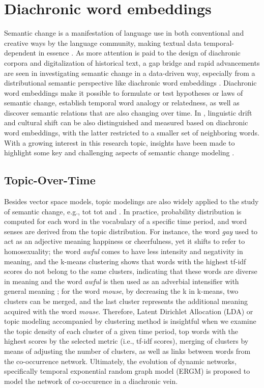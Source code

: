 \section{Diachronic word embeddings}
Semantic change is a manifestation of language use in both conventional and creative ways by the language community, making textual data temporal-dependent in essence \parencite{kutuzov2018survey}. As more attention is paid to the design of diachronic corpora and digitalization of historical text, a gap bridge and rapid advancements are seen in investigating semantic change in a data-driven way, especially from a distributional semantic perspective like diachronic word embeddings \parencite{kutuzov2018survey, tahmasebi2018survey, hamilton2016law, jawahar2019contextualized}. Diachronic word embeddings make it possible to formulate or test hypotheses or laws of semantic change, establish temporal word analogy or relatedness, as well as discover semantic relations that are also changing over time. In \textcite{hamilton2016cultural}, linguistic drift and cultural shift can be also distinguished and measured based on diachronic word embeddings, with the latter restricted to a smaller set of neighboring words. With a growing interest in this research topic, insights have been made to highlight some key and challenging aspects of semantic change modeling \parencite{kutuzov2018survey,tahmasebi2018survey,camacho2018survey}.

\subsection{Topic-Over-Time}
Besides vector space models, topic modelings are also widely applied to the study of semantic change, e.g., \acrlong{tot} \acrshort{tot} \parencite{wijaya2011understanding} and \textcite{hengchen2017phd}. In practice, probability distribution is computed for each word in the vocabulary of a specific time period, and word senses are derived from the topic distribution. For instance, the word \textit{gay} used to act as an adjective meaning happiness or cheerfulness, yet it shifts to refer to homosexuality; the word \textit{awful} comes to have less intensity and negativity in meaning, and the k-means clustering shows that words with the highest tf-idf scores do not belong to the same clusters, indicating that these words are diverse in meaning and the word \textit{awful} is then used as an adverbial intensifier with general meaning \parencite{wijaya2011understanding}; for the word \textit{mouse}, by decreasing the k in k-means, two clusters can be merged, and the last cluster represents the additional meaning acquired with the word \textit{mouse}. Therefore, Latent Dirichlet Allocation (LDA) or topic modeling accompanied by clustering method is insightful when we examine the topic density of each cluster of a given time period, top words with the highest scores by the selected metric (i.e., tf-idf scores), merging of clusters by means of adjusting the number of clusters, as well as links between words from the co-occurrence network. Ultimately, the evolution of dynamic networks, specifically temporal exponential random graph model (ERGM)\parencite{robins2007introduction} is proposed to model the network of co-occurence in a diachronic vein.

